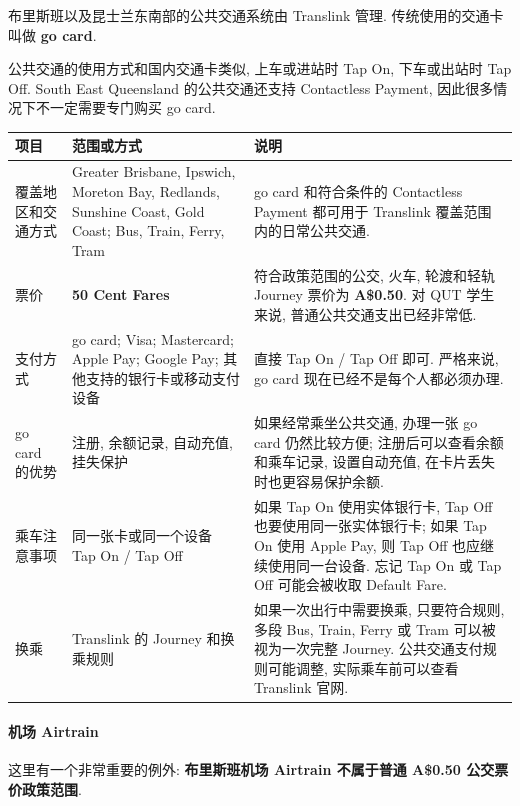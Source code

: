 \documentclass{jit-qut}
\begin{document}
布里斯班以及昆士兰东南部的公共交通系统由 Translink 管理. 传统使用的交通卡叫做 \textbf{go card}. 

公共交通的使用方式和国内交通卡类似, 上车或进站时 Tap On, 下车或出站时 Tap Off. South East Queensland 的公共交通还支持 Contactless Payment, 因此很多情况下不一定需要专门购买 go card. 


\scriptsize
\renewcommand{\arraystretch}{1.15}
\begin{longtable}{@{}>{\raggedright\arraybackslash}p{}>{\raggedright\arraybackslash}p{}>{\raggedright\arraybackslash}p{}@{}}
\toprule
项目 & 范围或方式 & 说明 \\
\midrule
\endhead
覆盖地区和交通方式 &
Greater Brisbane, Ipswich, Moreton Bay, Redlands, Sunshine Coast, Gold Coast; Bus, Train, Ferry, Tram &
go card 和符合条件的 Contactless Payment 都可用于 Translink 覆盖范围内的日常公共交通. \\
票价 &
\textbf{50 Cent Fares} &
符合政策范围的公交, 火车, 轮渡和轻轨 Journey 票价为 \textbf{A\$0.50}. 对 QUT 学生来说, 普通公共交通支出已经非常低. \\
支付方式 &
go card; Visa; Mastercard; Apple Pay; Google Pay; 其他支持的银行卡或移动支付设备 &
直接 Tap On / Tap Off 即可. 严格来说, go card 现在已经不是每个人都必须办理. \\
go card 的优势 &
注册, 余额记录, 自动充值, 挂失保护 &
如果经常乘坐公共交通, 办理一张 go card 仍然比较方便; 注册后可以查看余额和乘车记录, 设置自动充值, 在卡片丢失时也更容易保护余额. \\
乘车注意事项 &
同一张卡或同一个设备 Tap On / Tap Off &
如果 Tap On 使用实体银行卡, Tap Off 也要使用同一张实体银行卡; 如果 Tap On 使用 Apple Pay, 则 Tap Off 也应继续使用同一台设备. 忘记 Tap On 或 Tap Off 可能会被收取 Default Fare. \\
换乘 &
Translink 的 Journey 和换乘规则 &
如果一次出行中需要换乘, 只要符合规则, 多段 Bus, Train, Ferry 或 Tram 可以被视为一次完整 Journey. 公共交通支付规则可能调整, 实际乘车前可以查看 Translink 官网. \\
\bottomrule
\end{longtable}
\normalsize

\paragraph{机场 Airtrain}

这里有一个非常重要的例外: \textbf{布里斯班机场 Airtrain 不属于普通 A\$0.50 公交票价政策范围}. 
\end{document}
